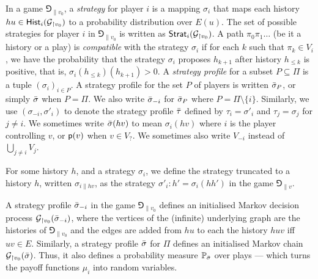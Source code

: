     In a game $\Game_{\|v_0}$, a \emph{strategy} for player $i$ is a mapping $\sigma_i$ that maps each history $hu \in \mathsf{Hist}_i(\mathcal{G}_{\upharpoonright v_0})$ to a probability distribution over $E(u)$.
The set of possible strategies for player $i$ in $\Game_{\|v_0}$ is written as $\mathsf{Strat}_i(\mathcal{G}_{\upharpoonright v_0})$.
A path $\pi_0 \pi_1 \dots$ (be it a history or a play) is \emph{compatible} with the strategy $\sigma_i$ if for each $k$ such that $\pi_k \in V_i$, we have the probability that the strategy $\sigma_i$ proposes $h_{k+1}$ after  history $h_{\leq k}$ is positive, that is, $\sigma_i(h_{\leq k})(h_{k+1}) > 0$.
A \emph{strategy profile} for a subset $P \subseteq \Pi$ is a tuple $(\sigma_i)_{i \in P}$.
A strategy profile for the set $P$ of players is written ${\bar{\sigma}}_P$, or simply ${\bar{\sigma}}$ when $P = \Pi$. We also write ${\bar{\sigma}}_{-i}$ for ${\bar{\sigma}}_P$ where $P = \Pi \setminus \{i\}$.
Similarly, we use $(\sigma_{-i}, \sigma'_i)$ to denote the strategy profile ${\bar{\tau}}$ defined by $\tau_i = \sigma'_i$ and $\tau_j = \sigma_j$ for $j \neq i$. 
We sometimes write ${\bar{\sigma}}(hv)$ to mean $\sigma_i(hv)$ where $i$ is the player controlling $v$, or $\mathsf{p}(v)$ when $v \in V_?$.
We sometimes also write $V_{-i}$ instead of $\bigcup_{j \neq i} V_j$. %

For some history $h$, and a strategy $\sigma_i$, we define the strategy truncated to a history $h$, written $\sigma_{i\| hv}$, as the strategy $\sigma'_i: h' = \sigma_i(hh')$ in the game $\Game_{\|v}$.

A strategy profile ${\bar{\sigma}}_{-i}$ in the game $\Game_{\|v_0}$ defines an initialised Markov decision process $\mathcal{G}_{\upharpoonright v_0}({\bar{\sigma}}_{-i})$, where the vertices of the (infinite) underlying graph are the histories of $\Game_{\|v_0}$ and the edges are added from $hu$ to each the history $huv$ iff  $uv \in E$.
Similarly, a strategy profile ${\bar{\sigma}}$ for $\Pi$ defines an initialised Markov chain $\mathcal{G}_{\upharpoonright v_0}({\bar{\sigma}})$.
Thus, it also defines a probability measure $\mathbb{P}_{\bar{\sigma}}$ over plays --- which turns the payoff functions $\mu_i$ into random variables.


